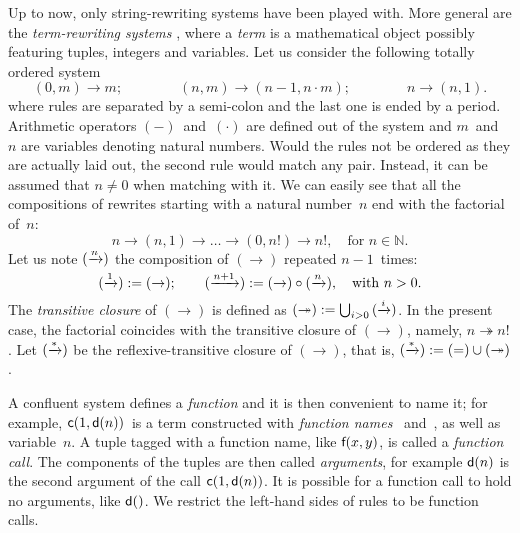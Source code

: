 Up to now, only string\hyp{}rewriting systems have been played
with. More general are the \emph{term\hyp{}rewriting
  systems} \citep{BaaderNipkow_1998}, where a
\emph{term} is a mathematical object possibly featuring
tuples, integers and variables. Let us consider the following totally
ordered system
\begin{equation}
(0,m) \rightarrow m;\qquad\qquad
(n,m) \rightarrow (n-1,n \cdot m);\qquad\qquad
n     \rightarrow (n,1).
\label{eq:fact_tf}
\end{equation}
where rules are separated by a semi\hyp{}colon and the last one is
ended by a period. Arithmetic operators \((-)\)~and~\((\cdot)\) are
defined out of the system and \(m\)~and~\(n\) are variables denoting
natural numbers. Would the rules not be ordered as they are actually
laid out, the second rule would match any pair. Instead, it can be
assumed that \(n \neq 0\) when matching with it. We can easily see
that all the compositions of rewrites starting with a natural
number~\(n\) end with the factorial of~\(n\):
\begin{equation*}
n \rightarrow (n,1) \rightarrow \dots \rightarrow (0,n!) \rightarrow
n!, \quad \text{for \(n \in \mathbb{N}\)}.
\end{equation*}
Let us note \((\xrightarrow{\smash{n}})\) the composition of
\((\rightarrow)\) repeated \(n-1\)~times:
\begin{equation*}
  (\xrightarrow{\smash{1}})   := (\rightarrow);\qquad
  (\xrightarrow{\smash{n+1}}) :=
     (\rightarrow) \circ (\xrightarrow{\smash{n}}),
\quad \text{with \(n > 0\)}.
\end{equation*}
The \emph{transitive closure} \label{transitive_closure} of \((\rightarrow)\) is defined
as \((\twoheadrightarrow) := \bigcup_{i >
  0}{(\xrightarrow{\smash{i}})}\). In the present case, the
factorial coincides with the transitive closure of
\((\rightarrow)\), namely, \(n \twoheadrightarrow n!\). Let
\((\xrightarrow{\smash{*}})\) be the reflexive\hyp{}transitive closure
of \((\rightarrow)\), that is, \((\xrightarrow{\smash{*}}) := (=) \cup
(\twoheadrightarrow)\). 

A confluent system defines a \emph{function} and it is then convenient
to name it; for example, \(\textsf{c}(1, \textsf{d}(n))\)~is a term
constructed with \emph{function names} ~and~, as well as
variable~\(n\). A tuple tagged with a function name, like
\(\textsf{f}(x,y)\), is called a \emph{function call}. The components of
the tuples are then called \emph{arguments}, for example
\(\textsf{d}(n)\) is the second argument of the call \(\textsf{c}(1,
\textsf{d}(n))\). It is possible for a function call to hold no
arguments, like \(\textsf{d}()\). We restrict the left\hyp{}hand sides of
rules to be function calls.


